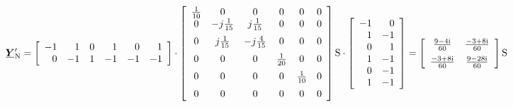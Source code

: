 \begin{exemple}
	{\fontsize{10pt}{10pt}\selectfont
		\[
		\mcmplx{Y}'\ped{N} =
		\begin{bmatrix}\begin{array}{rrrrrr}
				-1 & 1  & 0 &  1 & 0 & 1\\  0 & -1 & 1 & -1 & -1 & -1
		\end{array}\end{bmatrix} \cdot
		\begin{bmatrix}\begin{array}{cccccc}
				\frac{1}{10} & 0 & 0 & 0 & 0  & 0\\
				0 & -j\frac{1}{15} & j\frac{1}{15} & 0 & 0  & 0\\[2mm]
				0 & j\frac{1}{15} & -j\frac{4}{15} & 0 & 0  & 0\\[2mm]
				0 & 0 & 0 & \frac{1}{20} & 0  & 0\\[2mm]
				0 & 0 & 0 & 0 & \frac{1}{10} & 0\\[2mm]
				0 & 0 & 0 & 0 & 0 & 0
		\end{array}\end{bmatrix}\unit{S} \cdot
		\begin{bmatrix}\begin{array}{rr} 
				-1 & 0 \\ 1  & -1 \\  0 & 1 \\ 1 & -1 \\ 0 & -1 \\ 1 & -1
		\end{array}\end{bmatrix}
		=
		\begin{bmatrix}\begin{array}{cc}
				\frac{\complexnum{9 - j 4}}{60} & \frac{\complexnum{-3 + j 8}}{60} \\[2mm]
				\frac{\complexnum{-3 + j 8}}{60} & \frac{\complexnum{9 - j 28}}{60}
		\end{array}\end{bmatrix}\unit{S}
		\]}
	

\end{exemple}
